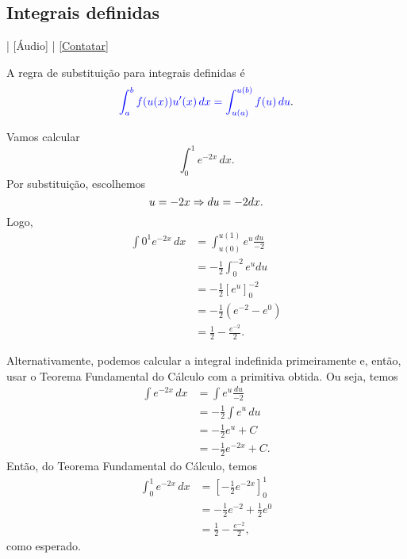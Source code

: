 \subsection{Integrais definidas}

\begin{flushright}
  [Vídeo] | [Áudio] | \href{https://phkonzen.github.io/notas/contato.html}{[Contatar]}
\end{flushright}

A regra de substituição para integrais definidas é
\begin{equation}
  {\color{blue}\int_a^b f(u(x))u'(x)\,dx = \int_{u(a)}^{u(b)} f(u)\,du}.
\end{equation}

\begin{ex}
  Vamos calcular
  \begin{equation}
    \int_0^1 e^{-2x}\,dx.
  \end{equation}
  Por substituição, escolhemos
  \begin{equation}
    u = -2x\\
    \Rightarrow du = -2dx.
  \end{equation}
  Logo,
  \begin{align}
    \int 0^1 e^{-2x}\,dx &= \int_{u(0)}^{u(1)} e^{u}\frac{du}{-2} \\
                         &= -\frac{1}{2}\int_{0}^{-2} e^udu \\
                         &= -\frac{1}{2}\left[e^u\right]_0^{-2} \\
                         &= -\frac{1}{2}\left(e^{-2} - e^0\right) \\
                         &= \frac{1}{2} - \frac{e^{-2}}{2}.
  \end{align}

  Alternativamente, podemos calcular a integral indefinida primeiramente e, então, usar o Teorema Fundamental do Cálculo com a primitiva obtida. Ou seja, temos
  \begin{align}
    \int e^{-2x}\,dx &= \int e^u\frac{du}{-2} \\
                     &= -\frac{1}{2}\int e^u\,du \\
                     &= -\frac{1}{2}e^u + C \\
                     &= -\frac{1}{2}e^{-2x} + C.
  \end{align}
  Então, do Teorema Fundamental do Cálculo, temos
  \begin{align}
    \int_0^1 e^{-2x}\,dx &= \left[-\frac{1}{2}e^{-2x}\right]_0^1 \\
                         &= -\frac{1}{2}e^{-2} + \frac{1}{2}e^{0} \\
                         &= \frac{1}{2} - \frac{e^{-2}}{2},
  \end{align}
  como esperado.

\end{ex}

